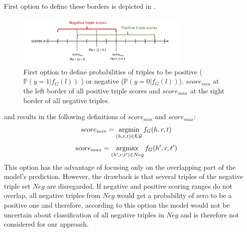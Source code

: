 First option to define these borders is depicted in .
\begin{figure}[t]
  \centering
    \includegraphics[width=0.75\textwidth]{figures/positives_negatives1.pdf}
  \caption{First option to define probabilities of triples to be positive ($\mathds{P}(y = 1 | f_G(l))$ ) or negative ($\mathds{P}(y = 0 | f_G(l))$). 
  $score_{min}$ at the left border of all positive triple scores and $score_{max}$ at the right border of all negative triples.}
  \label{fig:positives_negatives1}
\end{figure}
and results in the following definitions of  $score_{min}$ and 
$score_{max}$:
\begin{equation} \label{eqn:opt2_score_min}
    score_{min} = \operatorname*{argmin}_{(h,r,t) \in \mathcal{KG}}{f_G(h,r,t)}
\end{equation}
\begin{equation} \label{eqn:opt2_score_max}
    score_{max} = \operatorname*{argmax}_{(h',r,t') \in Neg}{f_G(h',r,t')}
\end{equation}
This option has the advantage of focusing only on the overlapping part of the model's prediction.
However, the drawback is that several triples of the negative triple set $Neg$ are disregarded.
If negative and positive scoring ranges do not overlap, all negative triples from $Neg$ would get a probability of zero to be a positive one and therefore, according to this option the model would not be uncertain about classification of all negative triples in $Neg$ and is therefore not considered for our approach.

